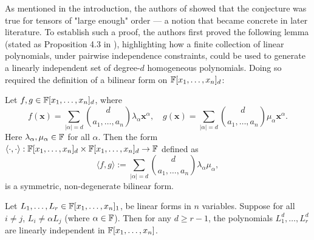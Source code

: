 \documentclass[../Lael_John_MasterThesis_Draft.tex]{subfiles}
\begin{document}
As mentioned in the introduction, the authors of \cite{comon_symmetric_2008} showed that the conjecture was true for tensors of "large enough" order --- a notion that became concrete in later literature.
To establish such a proof, the authors first proved the following lemma (stated as Proposition 4.3 in \cite{comon_symmetric_2008}), highlighting how a finite collection of linear polynomials, under pairwise independence constraints, could be used to generate a linearly independent set of degree-$d$ homogeneous polynomials. Doing so required the definition of a bilinear form on $\mathbb{F}[x_1, \ldots, x_n]_d$:
\begin{definition}\label{defn:bilinearformhompoly}
	Let $f, g \in \mathbb{F}[x_1, \ldots, x_n]_d$, where $$f(\mathbf{x}) = \sum_{|\alpha| = d} \binom{d}{a_1,\ldots, a_n}\lambda_{\alpha}\mathbf{x}^{\alpha},\quad g(\mathbf{x}) = \sum_{|\alpha| = d} \binom{d}{a_1,\ldots, a_n}\mu_{\alpha}\mathbf{x}^{\alpha}.$$Here $\lambda_{\alpha}, \mu_{\alpha} \in \mathbb{F}$ for all $\alpha$. Then the form $\langle \cdot, \cdot \rangle: \mathbb{F}[x_1, \ldots, x_n]_d \times \mathbb{F}[x_1, \ldots, x_n]_d \to \mathbb{F}$ defined as 
	\begin{equation}\label{eqn:bilinearformhompoly}
		\langle f, g \rangle := \sum_{|\alpha| = d} \binom{d}{a_1,\ldots,a_n}\lambda_{\alpha}\mu_{\alpha},
	\end{equation}
	is a symmetric, non-degenerate bilinear form. 
\end{definition}
\begin{lemma}\label{lemma:linearformsindependence}
	Let $L_1, \ldots, L_r \in \mathbb{F}[x_1,\ldots, x_n]_1$, be linear forms in $n$ variables. Suppose for all $i \neq j$, $L_i \neq \alpha L_j$ (where $\alpha \in \mathbb{F}$). Then for any $d \geq r-1$, the polynomials $L_1^d, \ldots, L_r^d$ are linearly independent in $\mathbb{F}[x_1, \ldots, x_n]$. 
\end{lemma}
\end{document}
